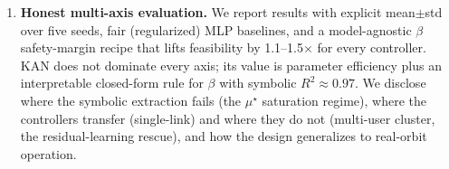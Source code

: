 \begin{enumerate}
\item \textbf{Honest multi-axis evaluation.} We report results with explicit mean$\pm$std over five seeds, fair (regularized) MLP baselines, and a model-agnostic $\beta$ safety-margin recipe that lifts feasibility by 1.1--1.5$\times$ for every controller. KAN does not dominate every axis; its value is parameter efficiency plus an interpretable closed-form rule for $\beta$ with symbolic $R^2 \approx 0.97$. We disclose where the symbolic extraction fails (the $\mu^\star$ saturation regime), where the controllers transfer (single-link) and where they do not (multi-user cluster, the residual-learning rescue), and how the design generalizes to real-orbit operation.
\end{enumerate}
